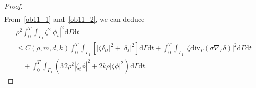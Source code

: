 \documentclass[10pt]{elsarticle}
\begin{document}
\begin{proof}
\begin{equation}
\begin{split}
\end{split}
\end{equation}
From~\eqref{ob11_1} and~\eqref{ob11_2}, we can deduce
 \begin{equation}\label{ob12}
\begin{split}
&\rho^2\int_{0}^{T}\int_{\Gamma_1}\zeta^2|\phi_t|^2 \mathrm{d}\Gamma \mathrm{d}t \\
&\leqslant C(\rho, m, d, k)\int_{0}^{T}\int_{\Gamma_1}\left[|\zeta \delta_{tt}|^2 +|\delta_t|^2 \right]\mathrm{d}\Gamma \mathrm{d}t +\int_{0}^{T}\int_{\Gamma_1}|\zeta\mathrm{div}_{\Gamma}\left(\sigma\nabla_{\Gamma} \delta\right)|^2 \mathrm{d}\Gamma \mathrm{d}t\\
&\quad + \int_{0}^{T}\int_{\Gamma_1}\left(32\rho^2|\zeta_t\phi|^2 + 2k\rho|\zeta\phi|^2\right) \mathrm{d}\Gamma \mathrm{d}t.
\end{split}
\end{equation}


\end{proof}
\end{document}

